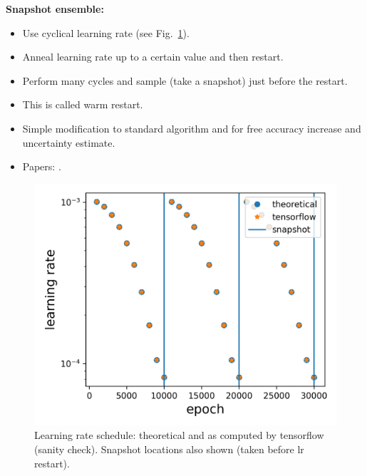 \textbf{Snapshot ensemble:}
\begin{itemize}
	\item Use cyclical learning rate (see Fig.~\ref{fig:lr_sched}).
	\item Anneal learning rate up to a certain value and then restart.
	\item Perform many cycles and sample (take a snapshot) just before the restart.
	\item This is called warm restart.
	\item Simple modification to standard algorithm and for free accuracy increase and uncertainty estimate.
	\item Papers: \textcite{smith2017cyclical, huang2017snapshot,loshchilov2016sgdr, garipov2018loss}.
\end{itemize}

\begin{figure}[H]
	\centering
	\includegraphics[width=0.6\linewidth]{./figs/learning_schedule.png}  
	\caption{Learning rate schedule: theoretical \autocite{loshchilov2016sgdr} and as computed by tensorflow (sanity check). Snapshot locations also shown (taken before lr restart).}
	\label{fig:lr_sched}
\end{figure}

\newpage
